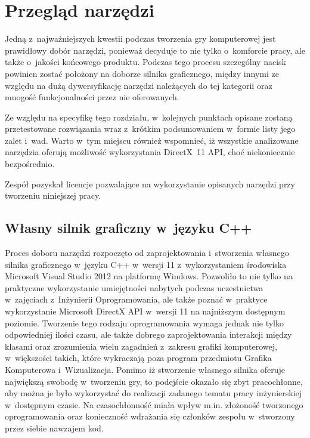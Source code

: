 
\chapter{Przegląd narzędzi}
Jedną z~najważniejszych kwestii podczas tworzenia gry komputerowej jest prawidłowy dobór narzędzi, ponieważ decyduje to nie tylko o~komforcie pracy, ale także o~jakości końcowego produktu. Podczas tego procesu szczególny nacisk powinien zostać położony na doborze silnika graficznego, między innymi ze względu na dużą dywersyfikację narzędzi należących do tej kategorii oraz mnogość funkcjonalności przez nie oferowanych.

Ze względu na specyfikę tego rozdziału, w~kolejnych punktach opisane zostaną przetestowane rozwiązania wraz z~krótkim podsumowaniem w~formie listy jego zalet i~wad. Warto w~tym miejscu również wspomnieć, iż wszystkie analizowane narzędzia oferują możliwość wykorzystania DirectX~11 API, choć niekoniecznie bezpośrednio.

Zespół pozyskał licencje pozwalające na wykorzystanie opisanych narzędzi przy tworzeniu niniejszej pracy.

\section{Własny silnik graficzny w~języku C++}
Proces doboru narzędzi rozpoczęto od zaprojektowania i~stworzenia własnego silnika graficznego w~języku C++ w~wersji 11 z~wykorzystaniem środowiska Microsoft Visual Studio 2012 na platformę Windows. Pozwoliło to nie tylko na praktyczne wykorzystanie umiejętności nabytych podczas uczestnictwa w~zajęciach z~Inżynierii Oprogramowania, ale także poznać w~praktyce wykorzystanie Microsoft DirectX API w~wersji 11 na najniższym dostępnym poziomie. Tworzenie tego rodzaju oprogramowania wymaga jednak nie tylko odpowiedniej ilości czasu, ale także dobrego zaprojektowania interakcji między klasami oraz zrozumienia wielu zagadnień z~zakresu grafiki komputerowej, w~większości takich, które wykraczają poza program przedmiotu Grafika Komputerowa i~Wizualizacja.
Pomimo iż stworzenie własnego silnika oferuje największą swobodę w~tworzeniu gry, to podejście okazało się zbyt pracochłonne, aby można je było wykorzystać do realizacji zadanego tematu pracy inżynierskiej w~dostępnym czasie. Na czasochłonność miała wpływ m.in. złożoność tworzonego oprogramowania oraz konieczność wdrażania się członków zespołu w~stworzony przez siebie nawzajem kod.\\

